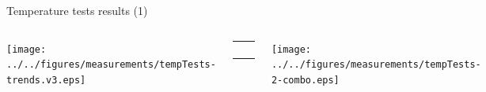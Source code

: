 \documentclass[compress,red]{beamer}
\begin{document}
\begin{frame}{Temperature tests results (1)}


  \begin{columns}[c]
		\hspace{-1.0cm}
		\begin{center}
		\texttt{[image: ../../figures/measurements/tempTests-trends.v3.eps]}
		\end{center}

		\begin{center}
		  \begin{table}[!t] \footnotesize 
		  \begin{tabular}{ c  c }     
		  \multicolumn{2}{c}{ }       \\         
		   \multicolumn{2}{c}{ }       \\    
		     &    \\ 
		    &     \\ 
		  \end{tabular}
		  \end{table}   		
		\end{center}

		\hspace{-0.8cm}
		\begin{center}
		\texttt{[image: ../../figures/measurements/tempTests-2-combo.eps]}
		\end{center}


\end{columns}
\end{frame}
\end{document}
